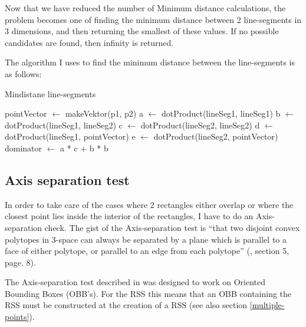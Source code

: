 Now that we have reduced the number of Minimum distance calculations, the problem becomes one of finding the minimum distance between 2 line-segments in 3 dimensions, and then returning the smallest of these values. If no possible candidates are found, then infinity is returned.

The algorithm I uses to find the minimum distance between the line-segments is as follows:\\
\begin{algorithm}[H]
  \caption{Mindistane line-segments}
  \label{mindist-lineseg}
   
  \dontprintsemicolon
   pointVector $\gets$ makeVektor(p1, p2) \;
   a $\gets$ dotProduct(lineSeg1, lineSeg1) \;
   b $\gets$ dotProduct(lineSeg1, lineSeg2) \;
   c $\gets$ dotProduct(lineSeg2, lineSeg2) \;
   d $\gets$ dotProduct(lineSeg1, pointVector) \;
   e $\gets$ dotProduct(lineSeg2, pointVector) \;
   dominator $\gets$ a * c + b * b \;
\end{algorithm}

\subsection{Axis separation test}
\label{sepAxis}

In order to take care of the cases where 2 rectangles either overlap or where the closest point lies inside the interior of the rectangles, I have to do an Axis-separation check. The gist of the Axis-separation test is ``that two disjoint convex polytopes in 3-space can always be separated by a plane which is parallel to a face of either polytope, or parallel to an edge from each polytope'' (\cite{237244}, section 5, page. 8).

The Axis-separation test described in \cite{237244} was designed to work on Oriented Bounding Boxes (OBB's). For the RSS this means that an OBB containing the RSS must be constructed at the creation of a RSS (see also section \ref{multiple-points}). 

